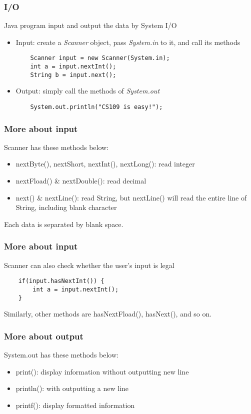 \documentclass{beamer}
\begin{document}
\begin{frame}[fragile]
    \frametitle{I/O}
    Java program input and output the data by System I/O
    \begin{itemize}
        \item Input: create a \textit{Scanner} object, pass \textit{System.in} to it, and call its methods
        \begin{lstlisting}
    Scanner input = new Scanner(System.in);
    int a = input.nextInt();
    String b = input.next();
        \end{lstlisting}
        \item Output: simply call the methods of \textit{System.out}
        \begin{lstlisting}
    System.out.println("CS109 is easy!");
        \end{lstlisting}
    \end{itemize}
\end{frame}

\begin{frame}
    \frametitle{More about input}
    Scanner has these methods below:
    \begin{itemize}
        \item nextByte(), nextShort, nextInt(), nextLong(): read integer
        \item nextFload() \& nextDouble(): read decimal
        \item next() \& nextLine(): read String, but nextLine() will read the entire line of String, including blank character
    \end{itemize}
    Each data is separated by blank space.
\end{frame}

\begin{frame}[fragile]
    \frametitle{More about input}
    Scanner can also check whether the user's input is legal
    \begin{lstlisting}
    if(input.hasNextInt()) {
        int a = input.nextInt();
    }
    \end{lstlisting}
    Similarly, other methods are hasNextFload(), hasNext(), and so on.
\end{frame}

\begin{frame}
    \frametitle{More about output}
    System.out has these methods below:
    \begin{itemize}
        \item print(): display information without outputting new line
        \item println(): with outputting a new line
        \item printf(): display formatted information
    \end{itemize}
\end{frame}
\end{document}
